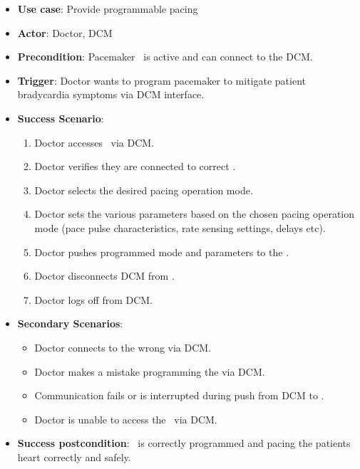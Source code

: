 \begin{itemize}
	\item \textbf{Use case}: Provide programmable pacing
	\item \textbf{Actor}: Doctor, DCM
	\item \textbf{Precondition}: Pacemaker \pgd\ is active and can connect to the DCM.
	\item \textbf{Trigger}: Doctor wants to program pacemaker to mitigate patient bradycardia symptoms via DCM interface.
	\item \textbf{Success Scenario}:
	\begin{enumerate}
		\item Doctor accesses \pgd\ via DCM.
		\item Doctor verifies they are connected to correct \pgd.
		\item Doctor selects the desired pacing operation mode.
		\item Doctor sets the various parameters based on the chosen pacing operation mode (pace pulse characteristics, rate sensing settings, delays etc).
		\item Doctor pushes programmed mode and parameters to the \pgd.
		\item Doctor disconnects DCM from \pgd.
		\item Doctor logs off from DCM.
	\end{enumerate}
	\item \textbf{Secondary Scenarios}:
	\begin{itemize}
		\item Doctor connects to the wrong \pgd via DCM.
		\item Doctor makes a mistake programming the \pgd via DCM.
		\item Communication fails or is interrupted during push from DCM to \pgd.
		\item Doctor is unable to access the \pgd\ via DCM.
	\end{itemize}
	\item \textbf{Success postcondition}: \pgd\ is correctly programmed and pacing the patients heart correctly and safely.
\end{itemize}

